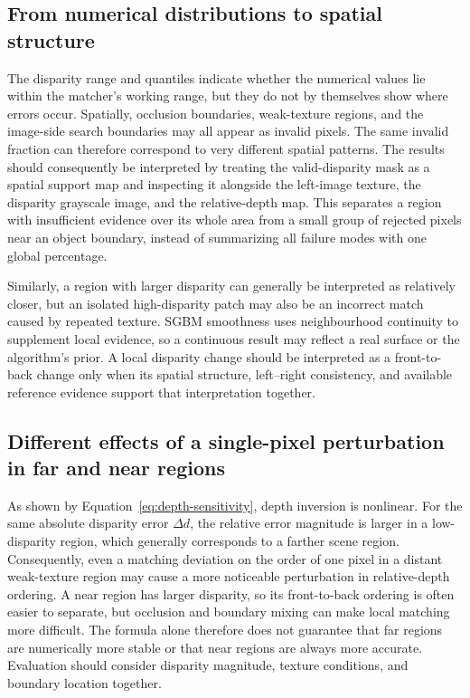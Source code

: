 \subsection{From numerical distributions to spatial structure}

The disparity range and quantiles indicate whether the numerical values lie within the matcher's working range, but they do not by themselves show where errors occur. Spatially, occlusion boundaries, weak-texture regions, and the image-side search boundaries may all appear as invalid pixels. The same invalid fraction can therefore correspond to very different spatial patterns. The results should consequently be interpreted by treating the valid-disparity mask as a spatial support map and inspecting it alongside the left-image texture, the disparity grayscale image, and the relative-depth map. This separates a region with insufficient evidence over its whole area from a small group of rejected pixels near an object boundary, instead of summarizing all failure modes with one global percentage.

Similarly, a region with larger disparity can generally be interpreted as relatively closer, but an isolated high-disparity patch may also be an incorrect match caused by repeated texture. SGBM smoothness uses neighbourhood continuity to supplement local evidence, so a continuous result may reflect a real surface or the algorithm's prior. A local disparity change should be interpreted as a front-to-back change only when its spatial structure, left--right consistency, and available reference evidence support that interpretation together.

\subsection{Different effects of a single-pixel perturbation in far and near regions}

As shown by Equation~\eqref{eq:depth-sensitivity}, depth inversion is nonlinear. For the same absolute disparity error $\Delta d$, the relative error magnitude is larger in a low-disparity region, which generally corresponds to a farther scene region. Consequently, even a matching deviation on the order of one pixel in a distant weak-texture region may cause a more noticeable perturbation in relative-depth ordering. A near region has larger disparity, so its front-to-back ordering is often easier to separate, but occlusion and boundary mixing can make local matching more difficult. The formula alone therefore does not guarantee that far regions are numerically more stable or that near regions are always more accurate. Evaluation should consider disparity magnitude, texture conditions, and boundary location together.

